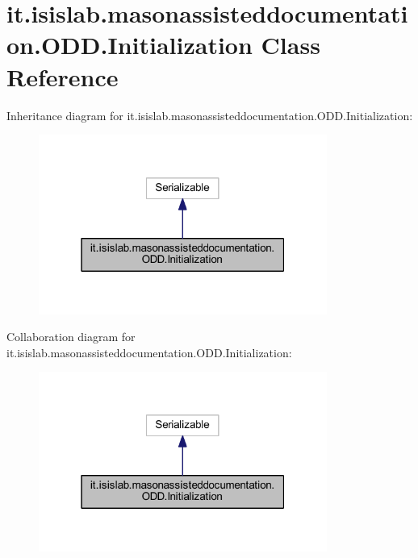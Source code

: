 \hypertarget{classit_1_1isislab_1_1masonassisteddocumentation_1_1_o_d_d_1_1_initialization}{\section{it.\-isislab.\-masonassisteddocumentation.\-O\-D\-D.\-Initialization Class Reference}
\label{classit_1_1isislab_1_1masonassisteddocumentation_1_1_o_d_d_1_1_initialization}
}


Inheritance diagram for it.\-isislab.\-masonassisteddocumentation.\-O\-D\-D.\-Initialization\-:\nopagebreak
\begin{figure}[H]
\begin{center}
\leavevmode
\includegraphics[width=268pt]{classit_1_1isislab_1_1masonassisteddocumentation_1_1_o_d_d_1_1_initialization__inherit__graph}
\end{center}
\end{figure}


Collaboration diagram for it.\-isislab.\-masonassisteddocumentation.\-O\-D\-D.\-Initialization\-:\nopagebreak
\begin{figure}[H]
\begin{center}
\leavevmode
\includegraphics[width=268pt]{classit_1_1isislab_1_1masonassisteddocumentation_1_1_o_d_d_1_1_initialization__coll__graph}
\end{center}
\end{figure}
